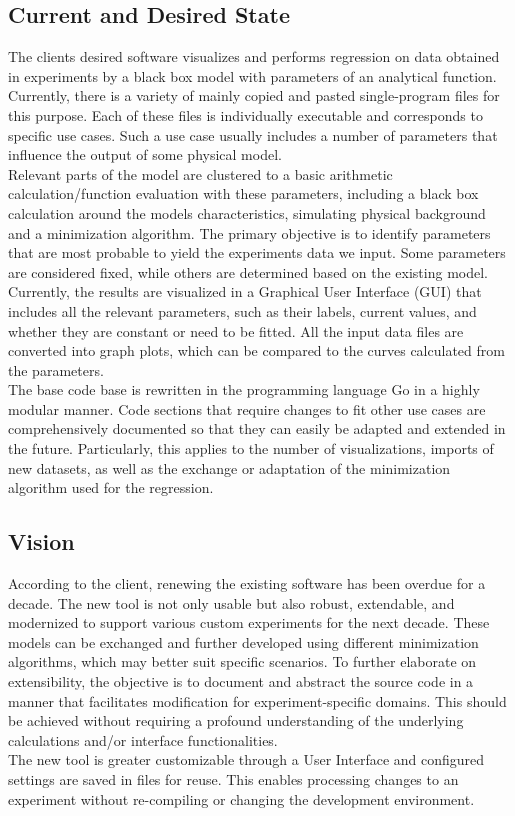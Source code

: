 \documentclass[
	points=true,
 	nenglish,
	colorbacktitle,
	identbarcolor=2b,
	accentcolor=2b
	]{tudaexercise}
\begin{document}
\subsection{Current and Desired State}
The clients desired software visualizes and performs regression on data obtained in experiments by a black box model with parameters of an analytical function. \\ Currently, there is a variety of mainly copied and pasted single-program files for this purpose. Each of these files is individually executable and corresponds to specific use cases. Such a use case usually includes a number of parameters that influence the output of some physical model. \\
Relevant parts of the model are clustered to a basic arithmetic calculation/function evaluation with these parameters, including a black box calculation around the models characteristics, simulating physical background and a minimization algorithm. The primary objective is to identify parameters that are most probable to yield the experiments data we input. Some parameters are considered fixed, while others are determined based on the existing model. \\
Currently, the results are visualized in a Graphical User Interface (GUI) that includes all the relevant parameters, such as their labels, current values, and whether they are constant or need to be fitted. All the input data files are converted into graph plots, which can be compared to the curves calculated from the parameters. \\
The base code base is rewritten in the programming language Go in a highly modular manner. Code sections that require changes to fit other use cases are comprehensively documented so that they can easily be adapted and extended in the future. Particularly, this applies to the number of visualizations, imports of new datasets, as well as the exchange or adaptation of the minimization algorithm used for the regression.
\subsection{Vision}

According to the client, renewing the existing software has been overdue for a decade. The new tool is not only usable but also robust, extendable, and modernized to support various custom experiments for the next decade. These models can be exchanged and further developed using different minimization algorithms, which may better suit specific scenarios.
To further elaborate on extensibility, the objective is to document and abstract the source code in a manner that facilitates modification for experiment-specific domains. This should be achieved without requiring a profound understanding of the underlying calculations and/or interface functionalities. \\
The new tool is greater customizable through a User Interface and configured settings are saved in files for reuse. This enables processing changes to an experiment without re-compiling or changing the development environment. \\ \\
\end{document}
